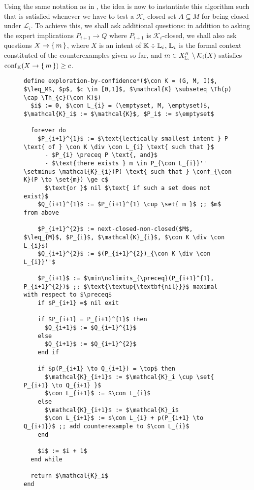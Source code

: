Using the same notation as in , the idea is
now to instantiate this algorithm such that  is satisfied whenever we have to
test a $\mathcal{K}_{i}$-closed set $A \subseteq M$ for being closed under
$\mathcal{L}_{i}$.  To achieve this, we shall ask additional questions: in addition to
asking the expert implications $P_{i+1} \to Q$ where $P_{i+1}$ is
$\mathcal{K}_{i}$-closed, we shall also ask questions $X \to {\ensuremath{\{\,m\,\}}}$, where $X$ is an
intent of ${\mathbb{K}} \div {\ensuremath{\mathbb{L}}}_{i}$, ${\mathbb{L}}_{i}$ is the formal context constituted of the
counterexamples given so far, and $m \in X_{{\mathbb{L}}_{i}}'' \setminus \mathcal{K}_{i}(X)$
satisfies $\operatorname{conf}_{{\mathbb{K}}}(X \to {\ensuremath{\{\,m\,\}}}) \ge c$.


\begin{figure}[tp]
  \begin{Algorithm}
    \label{alg:exploration-by-confidence-without-Th_c(K)-closures}
    \hspace*{0cm}
\begin{lstlisting}
define exploration-by-confidence*($\con K = (G, M, I)$, $\leq_M$, $p$, $c \in [0,1]$, $\mathcal{K} \subseteq \Th(p) \cap \Th_{c}(\con K)$)
  $i$ := 0, $\con L_{i} = (\emptyset, M, \emptyset)$, $\mathcal{K}_i$ := $\mathcal{K}$, $P_i$ := $\emptyset$

  forever do
    $P_{i+1}^{1}$ := $\text{lectically smallest intent } P \text{ of } \con K \div \con L_{i} \text{ such that }$
      - $P_{i} \preceq P \text{, and}$
      - $\text{there exists } m \in P_{\con L_{i}}'' \setminus \mathcal{K}_{i}(P) \text{ such that } \conf_{\con K}(P \to \set{m}) \ge c$
      $\text{or }$ nil $\text{ if such a set does not exist}$
    $Q_{i+1}^{1}$ := $P_{i+1}^{1} \cup \set{ m }$ ;; $m$ from above

    $P_{i+1}^{2}$ := next-closed-non-closed($M$, $\leq_{M}$, $P_{i}$, $\mathcal{K}_{i}$, $\con K \div \con L_{i}$)
    $Q_{i+1}^{2}$ := $(P_{i+1}^{2})_{\con K \div \con L_{i}}''$

    $P_{i+1}$ := $\min\nolimits_{\preceq}(P_{i+1}^{1}, P_{i+1}^{2})$ ;; $\text{\textup{\textbf{nil}}}$ maximal with respect to $\preceq$
    if $P_{i+1} =$ nil exit

    if $P_{i+1} = P_{i+1}^{1}$ then
      $Q_{i+1}$ := $Q_{i+1}^{1}$
    else
      $Q_{i+1}$ := $Q_{i+1}^{2}$
    end if

    if $p(P_{i+1} \to Q_{i+1}) = \top$ then
      $\mathcal{K}_{i+1}$ := $\mathcal{K}_i \cup \set{ P_{i+1} \to Q_{i+1} }$
      $\con L_{i+1}$ := $\con L_{i}$
    else
      $\mathcal{K}_{i+1}$ := $\mathcal{K}_i$
      $\con L_{i+1}$ := $\con L_{i} + p(P_{i+1} \to Q_{i+1})$ ;; add counterexample to $\con L_{i}$
    end

    $i$ := $i + 1$
  end while

  return $\mathcal{K}_i$  
end
\end{lstlisting}
  \end{Algorithm}
\end{figure}

